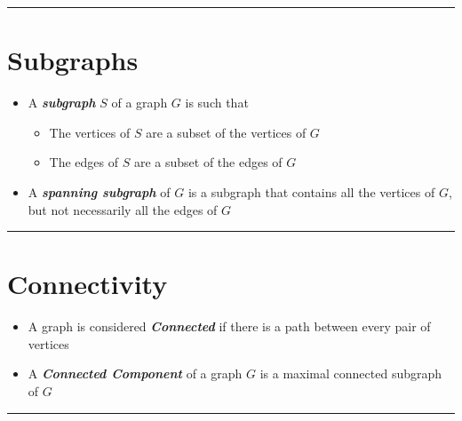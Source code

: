 \documentclass{article}
\begin{document}
\begin{center}
  \rule{0.5\textwidth}{0.4pt}
\end{center}

\section{Subgraphs}
\begin{itemize}
  \item{A \textbf{\textit{subgraph}} $S$ of a graph $G$ is such that}
  \begin{itemize}
    \item{The vertices of $S$ are a subset of the vertices of $G$}
    \item{The edges of $S$ are a subset of the edges of $G$}
  \end{itemize}
  \item{A \textbf{\textit{spanning subgraph}} of $G$ is a subgraph that contains all the vertices of $G$, but not necessarily all the edges of $G$}
\end{itemize}

\begin{center}
  \rule{0.5\textwidth}{0.4pt}
\end{center}

\section{Connectivity}
\begin{itemize}
  \item{A graph is considered \textbf{\textit{Connected}} if there is a path between every pair of vertices}
  \item{A \textbf{\textit{Connected Component}} of a graph $G$ is a maximal connected subgraph of $G$}
\end{itemize}

\begin{center}
  \rule{0.5\textwidth}{0.4pt}
\end{center}
\end{document}
